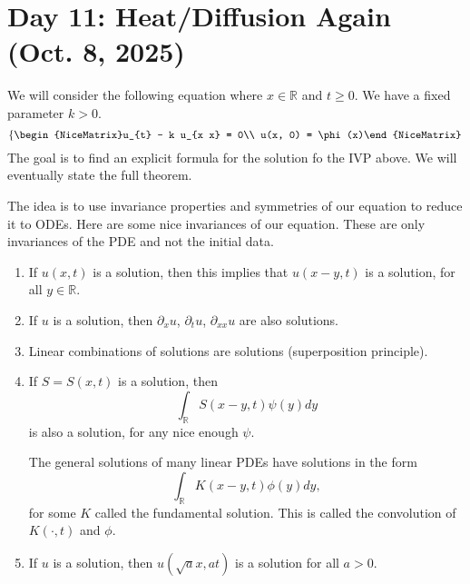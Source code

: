 \section{Day 11: Heat/Diffusion Again (Oct. 8, 2025)}

We will consider the following equation where \( x \in \mathbb{R} \) and \( t \ge 0 \). We have a fixed parameter \( k > 0 \).
\[ \left\{\begin{NiceMatrix}u_{t} - k u_{x x} = 0\\ u(x, 0) = \phi(x)\end{NiceMatrix}\right.  \]
The goal is to find an explicit formula for the solution fo the IVP above. We will eventually state the full theorem.

The idea is to use invariance properties and symmetries of our equation to reduce it to ODEs. 
Here are some nice invariances of our equation. These are only invariances of the PDE and not the initial data.
\begin{enumerate}

	\item If \( u(x, t) \) is a solution, then this implies that \( u(x - y, t) \) is a solution, for all \( y \in \mathbb{R} \).
	\item If \( u \) is a solution, then \( \partial_{x} u \), \( \partial_{t} u \), \( \partial_{x x}u \) are also solutions.
	\item Linear combinations of solutions are solutions (superposition principle).
	\item If \( S = S(x, t) \) is a solution, then
		\[ \int_{\mathbb{R}} S(x - y, t) \psi(y) dy \]
		is also a solution, for any nice enough \( \psi \).

\begin{remark}
	The general solutions of many linear PDEs have solutions in the form
	\[ \int_{\mathbb{R}} K(x-y, t) \phi(y) dy, \]
	for some \( K \) called the fundamental solution. This is called the convolution of \( K( \cdot, t) \) and \( \phi \). 
\end{remark}
	\item If \( u \) is a solution, then \( u( \sqrt{a} x, a t) \) is a solution for all \( a > 0 \).
\end{enumerate}
